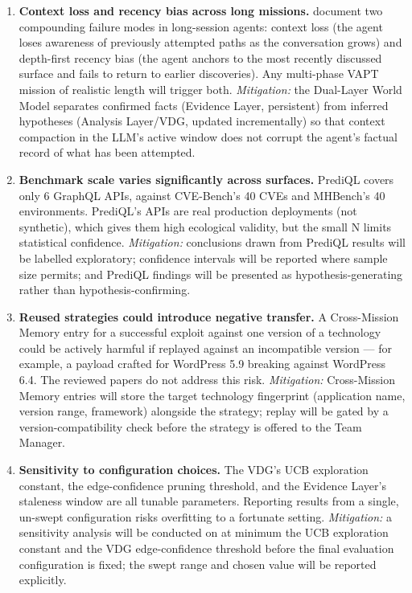 \begin{enumerate}
	\item \textbf{Context loss and recency bias across long missions.} \citet{deng2024pentestgpt} document two compounding failure modes in long-session agents: context loss (the agent loses awareness of previously attempted paths as the conversation grows) and depth-first recency bias (the agent anchors to the most recently discussed surface and fails to return to earlier discoveries). Any multi-phase VAPT mission of realistic length will trigger both. \textit{Mitigation:} the Dual-Layer World Model separates confirmed facts (Evidence Layer, persistent) from inferred hypotheses (Analysis Layer/VDG, updated incrementally) so that context compaction in the LLM's active window does not corrupt the agent's factual record of what has been attempted.

	\item \textbf{Benchmark scale varies significantly across surfaces.} PrediQL covers only 6 GraphQL APIs, against CVE-Bench's 40 CVEs and MHBench's 40 environments. PrediQL's APIs are real production deployments (not synthetic), which gives them high ecological validity, but the small N limits statistical confidence. \textit{Mitigation:} conclusions drawn from PrediQL results will be labelled exploratory; confidence intervals will be reported where sample size permits; and PrediQL findings will be presented as hypothesis-generating rather than hypothesis-confirming.

	\item \textbf{Reused strategies could introduce negative transfer.} A Cross-Mission Memory entry for a successful exploit against one version of a technology could be actively harmful if replayed against an incompatible version --- for example, a payload crafted for WordPress 5.9 breaking against WordPress 6.4. The reviewed papers do not address this risk. \textit{Mitigation:} Cross-Mission Memory entries will store the target technology fingerprint (application name, version range, framework) alongside the strategy; replay will be gated by a version-compatibility check before the strategy is offered to the Team Manager.

	\item \textbf{Sensitivity to configuration choices.} The VDG's UCB exploration constant, the edge-confidence pruning threshold, and the Evidence Layer's staleness window are all tunable parameters. Reporting results from a single, un-swept configuration risks overfitting to a fortunate setting. \textit{Mitigation:} a sensitivity analysis will be conducted on at minimum the UCB exploration constant and the VDG edge-confidence threshold before the final evaluation configuration is fixed; the swept range and chosen value will be reported explicitly.


\end{enumerate}
